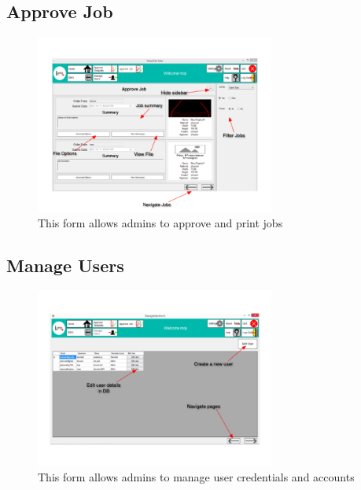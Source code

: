 \documentclass[oneside,openany,11pt,a4paper]{report}
\begin{document}
\subsection{Approve Job}
\begin{figure}[H]
	\centering
	\includegraphics[width=0.7\textwidth]{screen/approvejobs.png}
	\caption{This form allows admins to approve and print jobs}
\end{figure}

\subsection{Manage Users}
\begin{figure}[H]
	\centering
	\includegraphics[width=0.7\textwidth]{screen/manageuser.png}
	\caption{This form allows admins to manage user credentials and accounts}
\end{figure}
\end{document}

